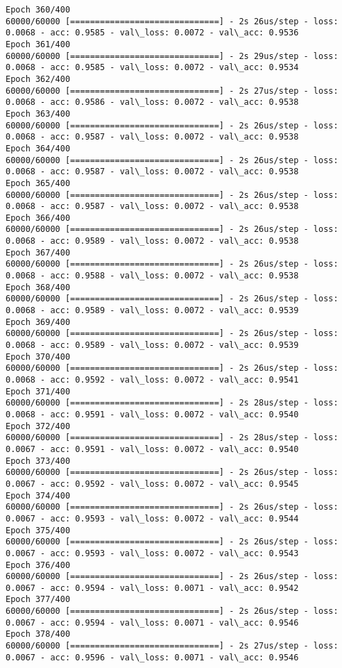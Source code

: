 \documentclass[11pt]{article}
\begin{document}
\begin{Verbatim}[commandchars=\\\{\}]
Epoch 360/400
60000/60000 [==============================] - 2s 26us/step - loss: 0.0068 - acc: 0.9585 - val\_loss: 0.0072 - val\_acc: 0.9536
Epoch 361/400
60000/60000 [==============================] - 2s 29us/step - loss: 0.0068 - acc: 0.9585 - val\_loss: 0.0072 - val\_acc: 0.9534
Epoch 362/400
60000/60000 [==============================] - 2s 27us/step - loss: 0.0068 - acc: 0.9586 - val\_loss: 0.0072 - val\_acc: 0.9538
Epoch 363/400
60000/60000 [==============================] - 2s 26us/step - loss: 0.0068 - acc: 0.9587 - val\_loss: 0.0072 - val\_acc: 0.9538
Epoch 364/400
60000/60000 [==============================] - 2s 26us/step - loss: 0.0068 - acc: 0.9587 - val\_loss: 0.0072 - val\_acc: 0.9538
Epoch 365/400
60000/60000 [==============================] - 2s 26us/step - loss: 0.0068 - acc: 0.9587 - val\_loss: 0.0072 - val\_acc: 0.9538
Epoch 366/400
60000/60000 [==============================] - 2s 26us/step - loss: 0.0068 - acc: 0.9589 - val\_loss: 0.0072 - val\_acc: 0.9538
Epoch 367/400
60000/60000 [==============================] - 2s 26us/step - loss: 0.0068 - acc: 0.9588 - val\_loss: 0.0072 - val\_acc: 0.9538
Epoch 368/400
60000/60000 [==============================] - 2s 26us/step - loss: 0.0068 - acc: 0.9589 - val\_loss: 0.0072 - val\_acc: 0.9539
Epoch 369/400
60000/60000 [==============================] - 2s 26us/step - loss: 0.0068 - acc: 0.9589 - val\_loss: 0.0072 - val\_acc: 0.9539
Epoch 370/400
60000/60000 [==============================] - 2s 26us/step - loss: 0.0068 - acc: 0.9592 - val\_loss: 0.0072 - val\_acc: 0.9541
Epoch 371/400
60000/60000 [==============================] - 2s 28us/step - loss: 0.0068 - acc: 0.9591 - val\_loss: 0.0072 - val\_acc: 0.9540
Epoch 372/400
60000/60000 [==============================] - 2s 28us/step - loss: 0.0067 - acc: 0.9591 - val\_loss: 0.0072 - val\_acc: 0.9540
Epoch 373/400
60000/60000 [==============================] - 2s 26us/step - loss: 0.0067 - acc: 0.9592 - val\_loss: 0.0072 - val\_acc: 0.9545
Epoch 374/400
60000/60000 [==============================] - 2s 26us/step - loss: 0.0067 - acc: 0.9593 - val\_loss: 0.0072 - val\_acc: 0.9544
Epoch 375/400
60000/60000 [==============================] - 2s 26us/step - loss: 0.0067 - acc: 0.9593 - val\_loss: 0.0072 - val\_acc: 0.9543
Epoch 376/400
60000/60000 [==============================] - 2s 26us/step - loss: 0.0067 - acc: 0.9594 - val\_loss: 0.0071 - val\_acc: 0.9542
Epoch 377/400
60000/60000 [==============================] - 2s 26us/step - loss: 0.0067 - acc: 0.9594 - val\_loss: 0.0071 - val\_acc: 0.9546
Epoch 378/400
60000/60000 [==============================] - 2s 27us/step - loss: 0.0067 - acc: 0.9596 - val\_loss: 0.0071 - val\_acc: 0.9546

\end{Verbatim}
\end{document}
